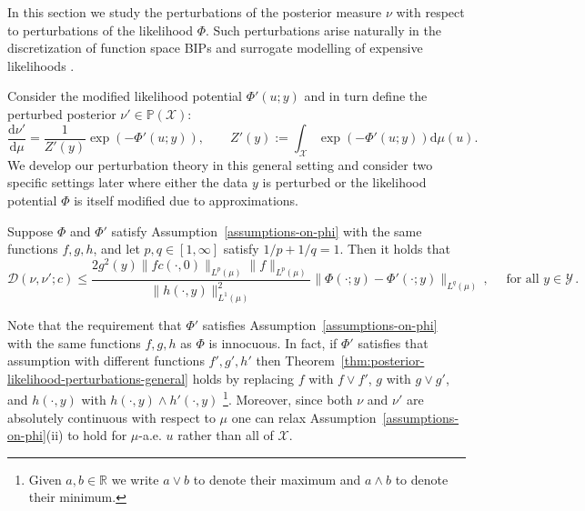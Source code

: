 \documentclass[final]{siamart171218}
\newcommand{\mcl}{\mathcal}
\newcommand{\mbb}{\mathbb}
\newcommand{\dd}{\text{d}}
\newcommand{\R}{\mbb{R}}
\newcommand{\mX}{\mcl{X}}
\newcommand{\mY}{\mcl{Y}}
\newcommand{\PP}{\mbb{P}}
\newcommand{\cc}{c}
\newcommand{\K}{\mathcal{D}}
\begin{document}
In this section we study the perturbations of the posterior measure $\nu$ with respect to
perturbations of the likelihood $\Phi$. Such perturbations arise 
naturally in the discretization of function space BIPs and
 surrogate modelling of expensive likelihoods \cite{marzouk2007stochastic, schwab-sparse, marzouk2009dimensionality, ma2009efficient, stuart2018posterior, teckentrup2020convergence, herrmann2020deep, li2020fourier}.

Consider the modified
likelihood potential $\Phi'( u; y)$ and in turn define the perturbed posterior $\nu' \in \PP(\mX)$: 
\begin{equation}
  \label{Bayes-rule-perturbed-likelihood}
  \frac{\dd \nu'}{\dd \mu} = \frac{1}{Z'(y)} \exp \left( - \Phi'(u; y) \right),
  \qquad Z'(y) := \int_\mX \exp( - \Phi'(u;y)) \dd \mu(u).
\end{equation}
We develop our perturbation theory in this general setting and 
consider two specific settings later where
either the data $y$ is perturbed or the likelihood potential $\Phi$ is itself modified
due to approximations.

\begin{theorem}\label{thm:posterior-likelihood-perturbations-general}
  Suppose $\Phi$ and $\Phi'$ satisfy Assumption~\ref{assumptions-on-phi} 
  with the same functions  $f,g ,h$,
  and let $p, q \in [1, \infty]$
  satisfy $1/p + 1/q = 1$. 
  Then it holds that
  \begin{equation*}
    \K(\nu, \nu'; \cc) \le
    \frac{ 2 g^2(y) \| f c(\cdot, 0) \|_{L^p(\mu)} \| f \|_{L^p(\mu)}}{\| h(\cdot, y) \|_{L^1(\mu)}^2}
  \| \Phi(\cdot; y) - \Phi'(\cdot; y) \|_{L^q(\mu)}\,,\quad \text{ for all } y\in\mY\,.
    \end{equation*}
  \end{theorem}

  \begin{remark}
    Note that the requirement that $\Phi'$ satisfies Assumption~\ref{assumptions-on-phi} with
    the same functions $f, g, h$ as $\Phi$ is innocuous. In fact, if $\Phi'$ satisfies
    that assumption with different functions $f', g', h'$ then
    Theorem~\ref{thm:posterior-likelihood-perturbations-general} holds by replacing
    $f$ with
    $f \vee f'$, $g$ with $g \vee g'$, and $h(\cdot, y)$ with $h(\cdot, y) \wedge h'(\cdot, y)$ 
    \footnote{Given $a, b \in \R$ we write $a \vee b$ to denote 
    their maximum and $a \wedge b$ to denote their minimum.}.
    Moreover, since both $\nu$ and $\nu'$ are absolutely continuous with respect
    to $\mu$ one can relax Assumption~\ref{assumptions-on-phi}(ii) to hold
    for $\mu$-a.e. $u$ rather than all of $\mX$.
\end{remark}
\end{document}
